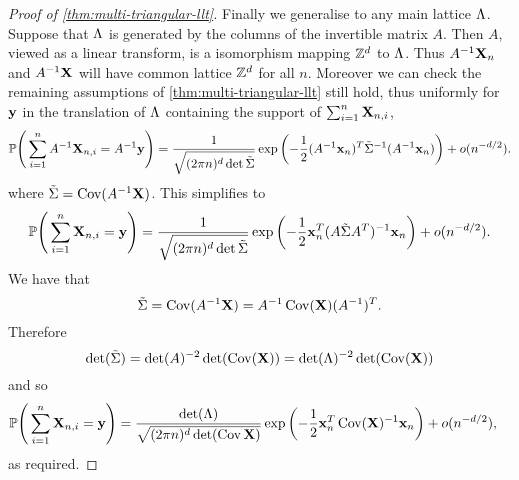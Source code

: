 \begin{proof}[Proof of \cref{thm:multi-triangular-llt}]
    Finally we generalise to any main lattice $\Lambda$. Suppose that $\Lambda$ is generated by the columns of the invertible matrix $A$. Then $A$, viewed as a linear transform, is a isomorphism mapping ${\mathbb Z}^d$ to $\Lambda$. Thus $A^{-1}{\mathbf X}_n$ and $A^{-1}{\mathbf X}$ will have common lattice ${\mathbb Z}^d$ for all $n$. Moreover we can check the remaining assumptions of \cref{thm:multi-triangular-llt} still hold, thus uniformly for ${\mathbf y}$ in the translation of $\Lambda$ containing the support of $\sum_{i=1}^n {\mathbf X}_{n, i}$,
    \begin{equation*}
        {\mathbb P}\Bigg(\sum_{i=1}^n A^{-1} {\mathbf X}_{n, i} = A^{-1}{\mathbf y}\Bigg)
        = \frac{1}{\sqrt{(2 \pi n)^{d} \det\tilde{\Sigma}}} \exp \left( 
            -\frac{1}{2} (A^{-1} {\mathbf x}_n)^T \tilde{\Sigma}^{-1} (A^{-1} {\mathbf x}_n)
        \right) + o(n^{-d/2}).
    \end{equation*}
    where $\tilde{\Sigma} = \operatorname{Cov}(A^{-1} {\mathbf X})$. This simplifies to
    \begin{equation*}
        {\mathbb P}\Bigg(\sum_{i=1}^n {\mathbf X}_{n, i} = {\mathbf y}\Bigg)
        = \frac{1}{\sqrt{(2 \pi n)^{d} \det\tilde{\Sigma}}} \exp \left( 
            -\frac{1}{2} {\mathbf x}_n^T (A \tilde{\Sigma} A^T)^{-1} {\mathbf x}_n 
        \right) + o(n^{-d/2}).
    \end{equation*}
    We have that
    \begin{equation*}
        \tilde{\Sigma}
        = \operatorname{Cov}(A^{-1} {\mathbf X})
        = A^{-1} \operatorname{Cov}({\mathbf X}) (A^{-1})^T.
    \end{equation*}
    Therefore
    \begin{equation*}
        \det(\tilde{\Sigma}) = \det(A)^{-2} \det(\operatorname{Cov}({\mathbf X})) = \det(\Lambda)^{-2} \det(\operatorname{Cov}({\mathbf X}))
    \end{equation*}
    and so
    \begin{align*}
        {\mathbb P}\Bigg(\sum_{i=1}^n {\mathbf X}_{n, i} = {\mathbf y}\Bigg)
        &= \frac{\det(\Lambda)}{\sqrt{(2 \pi n)^{d} \det(\operatorname{Cov} {\mathbf X})}} \exp \left( 
            -\frac{1}{2} {\mathbf x}_n^T \operatorname{Cov}({\mathbf X})^{-1} {\mathbf x}_n 
         \right) + o(n^{-d/2}),
    \end{align*}
    as required.
\end{proof}